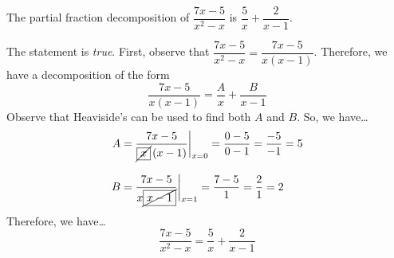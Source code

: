 \documentclass[11pt,letterpaper]{article}
\begin{document}
 The partial fraction decomposition of $\dfrac{7x - 5}{x^2 - x}$ \;is\; $\dfrac{5}{x} + \dfrac{2}{x - 1}$. \pspace

\sol The statement is \textit{true}. First, observe that $\dfrac{7x - 5}{x^2 - x}= \dfrac{7x - 5}{x(x - 1)}$. Therefore, we have a decomposition of the form
	\[
	\dfrac{7x - 5}{x(x - 1)}= \dfrac{A}{x} + \dfrac{B}{x - 1}
	\]
Observe that Heaviside's can be used to find both $A$ and $B$. So, we have\dots
	\[
	\begin{aligned}
	A&= \dfrac{7x - 5}{\cancel{\boxed{x}}\, (x - 1)} \bigg|_{x= 0}= \dfrac{0 - 5}{0 -1}= \dfrac{-5}{-1}= 5 \\[0.3cm]
	B&= \dfrac{7x - 5}{x \cancel{\boxed{x - 1}}} \bigg|_{x= 1}= \dfrac{7 - 5}{1}= \dfrac{2}{1}= 2
	\end{aligned}
	\]
Therefore, we have\dots
	\[
	\dfrac{7x - 5}{x^2 - x}= \dfrac{5}{x} + \dfrac{2}{x - 1}
	\] \pvspace{1.3cm}
\end{document}
